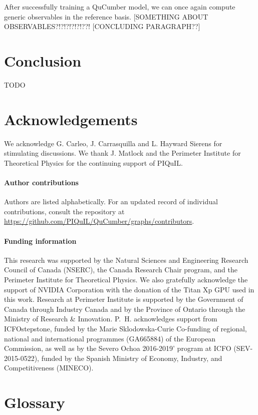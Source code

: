\documentclass[submission, Phys, hidelnks]{SciPost}
\newcommand{\red}[1]{{\color{red} #1}}
\begin{document}
After successfully training a QuCumber model, we can once again compute generic observables in the reference basis.  
\red{[SOMETHING ABOUT OBSERVABLES?!?!?!?!?!??!}
\red{[CONCLUDING PARAGRAPH??]}

\section{Conclusion}
\red{TODO}


\section*{Acknowledgements}
We acknowledge G. Carleo, J. Carrasquilla and L. Hayward Sierens for stimulating discussions. 
We thank J. Matlock and the Perimeter Institute for Theoretical Physics for the continuing support of PIQuIL.

\paragraph{Author contributions}
Authors are listed alphabetically. For an updated record of individual contributions, consult the repository at \url{https://github.com/PIQuIL/QuCumber/graphs/contributors}.

\paragraph{Funding information}

This research was supported by the Natural Sciences and Engineering
Research Council of Canada (NSERC), the
Canada Research Chair program, and the Perimeter Institute
for Theoretical Physics. We also gratefully
acknowledge the support of NVIDIA Corporation with
the donation of the Titan Xp GPU used in this work.
Research at Perimeter Institute is supported by the Government
of Canada through Industry Canada and by the
Province of Ontario through the Ministry of Research \&
Innovation. P.~H. acknowledges support from ICFOstepstone, funded by the Marie Sklodowska-Curie Co-funding of regional, national and international programmes (GA665884) of the European Commission, as well as by the Severo Ochoa 2016-2019' program at ICFO (SEV-2015-0522), funded by the Spanish Ministry of Economy, Industry, and Competitiveness (MINECO).


\appendix
\section{Glossary}
\label{Glossary}
\end{document}
